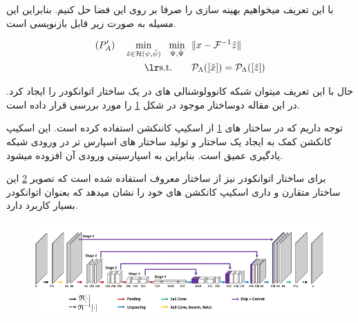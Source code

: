 با این تعریف میخواهیم بهینه سازی را صرفا بر روی این فضا حل کنیم. بنابراین این مسیله به صورت زیر قابل بازنویسی است.

\begin{subequations}\label{eq:P'A}
	\begin{align}
		(P'_A) \quad
		\min_{\hat{z}\in\mathbb{\mathcal{H}(\psi, \tilde{\psi})}} \ \
		\min_{\Psi, \tilde{\Psi}} \ \  & \| x - \F^{-1}{\hat{z}}\| \\
		\lrtext{s.t.} \qquad  & \Rho_\Lambda([\hat{x}]) = \Rho_\Lambda([\hat{z}])
	\end{align}
\end{subequations}


حال با این تعریف میتوان شبکه کانوولوشنالی های در یک ساختار اتوانکودر را ایجاد کرد.
در این مقاله دوساختار موجود در شکل 	\ref{fig:kspace2020-architectures}
را مورد بررسی قرار داده است.

\begin{figure}
	\centering
	\label{fig:kspace2020-architectures}
\end{figure}

توجه داریم که در ساختار های \ref{fig:kspace2020-architectures}
از اسکیپ کاننکشن 
استفاده کرده است. این اسکیپ کانکشن کمک به ایجاد یک ساختار  و تولید ساختار های اسپارس تر در ورودی شبکه یادگیری عمیق است. بنابراین به اسپارسیتی ورودی آن افزوده میشود.

برای ساختار اتوانکودر نیز از ساختار معروف  استفاده شده است که تصویر 
\ref{fig:unet}
این ساختار متقارن و داری اسکیپ کانکشن های خود را نشان میدهد که بعنوان اتوانکودر بسیار کاربرد دارد.



\begin{figure}
	\centering
	\includegraphics[width=0.9\linewidth]{chapters/chapter-3/figs/unet}
	\caption{}
	\label{fig:unet}
\end{figure}









